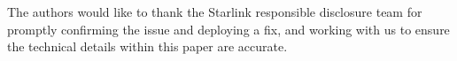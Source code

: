 \documentclass[conference]{IEEEtran}
\begin{document}
The authors would like to thank the Starlink responsible disclosure team for promptly confirming the issue and deploying a fix, and working with us to ensure the technical details within this paper are accurate.

\clearpage





\appendices



\end{document}
